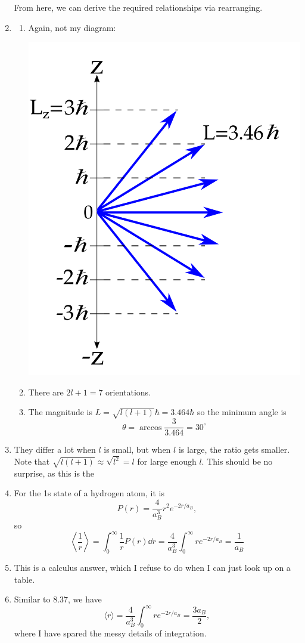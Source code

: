 \documentclass{article}
\begin{document}
\begin{enumerate}[label=(8.\arabic*)]
\begin{equation}
    \end{equation}
    From here, we can derive the required relationships via rearranging.
    \setcounter{enumi}{24}
    \item \begin{enumerate}
        \item Again, not my diagram:
        \begin{center}
            \includegraphics[width=0.6\linewidth]{figs/8.25.png}
        \end{center}
        \item There are $2l+1=7$ orientations.
        \item The magnitude is $L=\sqrt{l(l+1)}\hbar = 3.464\hbar$ so the minimum angle is 
        \begin{equation}
            \theta = \arccos\frac{3}{3.464} = 30^\circ
        \end{equation}
    \end{enumerate}
    \setcounter{enumi}{26}
    \item They differ a lot when $l$ is small, but when $l$ is large, the ratio gets smaller. Note that $\sqrt{l(l+1)}\approx \sqrt{l^2} = l$ for large enough $l$. This should be no surprise, as this is the 
    \setcounter{enumi}{36}
    \item For the 1s state of a hydrogen atom, it is
    \begin{equation}
        P(r) = \frac{4}{a_B^3}r^2e^{-2r/a_B},
    \end{equation}
    so 
    \begin{equation}
        \left\langle \frac{1}{r}\right\rangle = \int_0^\infty \frac{1}{r}P(r) \dd{r} = \frac{4}{a_B^3} \int_0^\infty re^{-2r/a_B} = \frac{1}{a_B}
    \end{equation}
    \setcounter{enumi}{40}
    \item This is a calculus answer, which I refuse to do when I can just look up on a table.
    \item Similar to 8.37, we have
    \begin{equation}
        \langle r\rangle = \frac{4}{a_B^3}\int_0^\infty r e^{-2r/a_B} = \frac{3a_B}{2} ,
    \end{equation}
    where I have spared the messy details of integration.


\end{enumerate}
\end{document}
